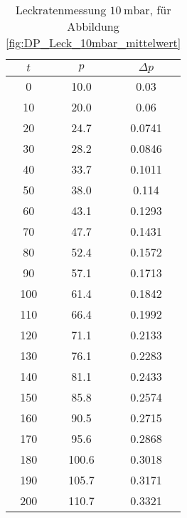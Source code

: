 \begin{table}[H]
    \centering
    \caption{Leckratenmessung $\SI{10}{\milli\bar}$, für Abbildung \ref{fig:DP_Leck_10mbar_mittelwert}}
    \label{tab:}
    \begin{tabular}{c c c}
        \toprule
        {$t$} & {$p$} & {$\Delta p$} \\
        \midrule
        0 & 10.0 & 0.03 \\
        10 & 20.0 & 0.06\\
        20 & 24.7 & 0.0741\\
        30 & 28.2 & 0.0846\\
        40 & 33.7 & 0.1011\\
        50 & 38.0 & 0.114\\
        60 & 43.1 & 0.1293\\
        70 & 47.7 & 0.1431\\
        80 & 52.4 & 0.1572\\
        90 & 57.1 & 0.1713\\
        100 & 61.4 & 0.1842\\
        110 & 66.4 & 0.1992\\
        120 & 71.1 & 0.2133\\
        130 & 76.1 & 0.2283\\
        140 & 81.1 & 0.2433\\
        150 & 85.8 & 0.2574\\
        160 & 90.5 & 0.2715\\
        170 & 95.6 & 0.2868\\
        180 & 100.6 & 0.3018\\
        190 & 105.7 & 0.3171\\
        200 & 110.7 & 0.3321\\
        \bottomrule
    \end{tabular}
\end{table}

